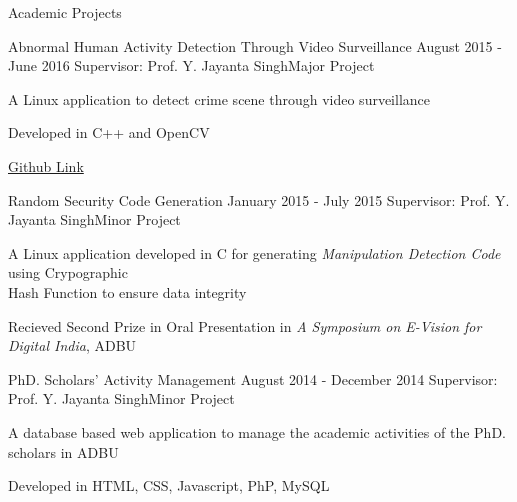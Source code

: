 \documentclass{resume}
\begin{document}
\begin{rSection}{Academic Projects}
	
	\begin{rSubsection}{Abnormal Human Activity Detection Through Video Surveillance} {August 2015 - June 2016}
		{Supervisor: Prof. Y. Jayanta Singh}{Major Project}
		\item A Linux application to detect crime scene through video surveillance
		\item Developed in C++ and OpenCV
		\item \href{https://github.com/debashisbarman/HumanActivityRecognition}{Github Link}
	\end{rSubsection}
	    
	\begin{rSubsection}{Random Security Code Generation} {January 2015 - July 2015}
		{Supervisor: Prof. Y. Jayanta Singh}{Minor Project}
		\item A Linux application developed in C for generating \textit{Manipulation Detection Code} using Crypographic\\
		Hash Function to ensure data integrity
		\item Recieved Second Prize in Oral Presentation in \textit{A Symposium on E-Vision for Digital India}, ADBU
	\end{rSubsection}
	    
	\begin{rSubsection}{PhD. Scholars' Activity Management} {August 2014 - December 2014}
		{Supervisor: Prof. Y. Jayanta Singh}{Minor Project}
		\item A database based web application to manage the academic activities of the PhD. scholars in ADBU
		\item Developed in HTML, CSS, Javascript, PhP, MySQL
		    
	\end{rSubsection}
	    
	
\end{rSection}
\end{document}

